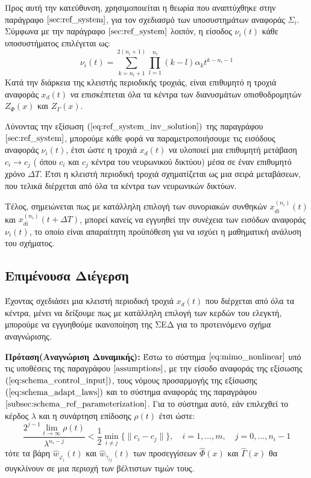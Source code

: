 Προς αυτή την κατεύθυνση, χρησιμοποιείται η θεωρία που αναπτύχθηκε στην παράγραφο $\ref{sec:ref_system}$, για τον σχεδιασμό των υποσυστημάτων αναφοράς $\Sigma_i$. Σύμφωνα με την παράγραφο $\ref{sec:ref_system}$ λοιπόν, η είσοδος $\nu_i(t)$ κάθε υποσυστήματος επιλέγεται ως:
\begin{equation}
	\nu_i(t) = \sum_{k=n_i + 1}^{2(n_i + 1)} \prod_{l = 1}^{n_i} (k-l) \alpha_k t^{k - n_i - 1}
\end{equation}
Κατά την διάρκεια της κλειστής περιοδικής τροχιάς, είναι επιθυμητό η τροχιά αναφοράς $x_d(t)$ να επισκέπτεται όλα τα κέντρα των διανυσμάτων οπισθοδρομητών $Z_{\Phi}(x)$ και $Z_{\Gamma}(x)$. 

Λύνοντας την εξίσωση $(\ref{eq:ref_system_inv_solution})$ της παραγράφου $\ref{sec:ref_system}$, μπορούμε κάθε φορά να παραμετροποιήσουμε τις εισόδους αναφοράς $\nu_i(t)$, έτσι ώστε η τροχιά $x_d(t)$ να υλοποιεί μια επιθυμητή μετάβαση $c_i \rightarrow c_j$ ( όπου $c_i$ και $c_j$ κέντρα του νευρωνικού δικτύου) μέσα σε έναν επιθυμητό χρόνο $\Delta T$. Έτσι η κλειστή περιοδική τροχιά σχηματίζεται ως μια σειρά μεταβάσεων, που τελικά διέρχεται από όλα τα κέντρα των νευρωνικών δικτύων.

Τέλος, σημειώνεται πως με κατάλληλη επιλογή των συνοριακών συνθηκών $x_{di}^{(n_i)}(t)$ και $x_{di}^{(n_i)}(t+ \Delta T)$, μπορεί κανείς να εγγυηθεί την συνέχεια των εισόδων αναφοράς $\nu_i(t)$, το οποίο είναι απαραίτητη προϋπόθεση για να ισχύει η μαθηματική ανάλυση του σχήματος.

\subsection{Επιμένουσα Διέγερση}
Έχοντας σχεδιάσει μια κλειστή περιοδική τροχιά $x_d(t)$ που διέρχεται από όλα τα κέντρα, μένει να δείξουμε πως με κατάλληλη επιλογή των κερδών του ελεγκτή, μπορούμε να εγγυηθούμε ικανοποίηση της ΣΕΔ για το προτεινόμενο σχήμα αναγνώρισης.

\textbf{Πρόταση(Αναγνώριση Δυναμικής):}
Έστω το σύστημα $\ref{eq:mimo_nonlinear}$ υπό τις υποθέσεις της παραγράφου $\ref{assumptions}$, με την είσοδο αναφοράς της εξίσωσης $(\ref{eq:schema_control_input})$, τους νόμους προσαρμογής της εξίσωσης $(\ref{eq:schema_adapt_laws})$ και το σύστημα αναφοράς της παραγράφου $\ref{subsec:schema_ref_parameterization}$. Για το σύστημα αυτό, εάν επιλεχθεί το κέρδος $\lambda$ και η συνάρτηση επίδοσης $\rho(t)$ έτσι ώστε:
\begin{equation}
	\frac{ 2^{j-1} \lim\limits_{t \rightarrow \infty}\rho(t)}{\lambda^{n_i - j}} < \frac{1}{2} \min_{i \neq j} \{\| c_i - c_j \| \},
	\quad i=1,\dots,m, \quad j = 0,\dots,n_i-1
	\label{eq:PE_hypothesis}
\end{equation}
τότε τα βάρη $\hat{w}_{\varphi_i}(t)$ και $\hat{w}_{\gamma_{ij}}(t)$ των προσεγγίσεων $\hat{\Phi}(x)$ και $\hat{\Gamma}(x)$ θα συγκλίνουν σε μια περιοχή των βέλτιστων τιμών τους.

